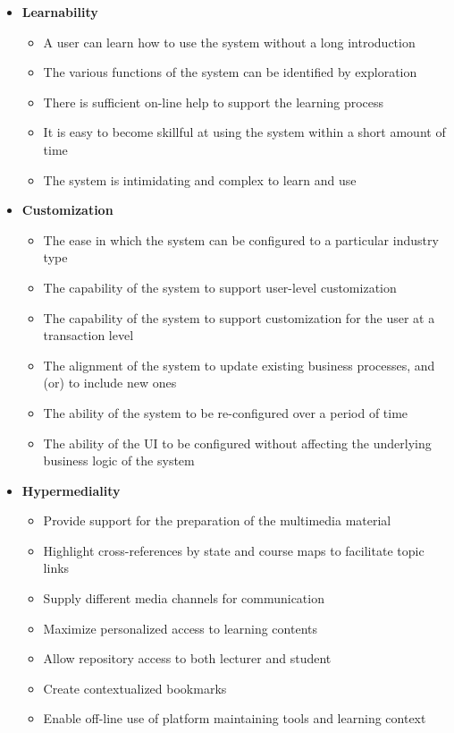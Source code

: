 \begin{itemize}
	\item \textbf{Learnability}
		\begin{itemize}
			\item A user can learn how to use the system without a long introduction
			\item The various functions of the system can be identified by exploration
			\item There is sufficient on-line help to support the learning process
			\item It is easy to become skillful at using the system within a short amount of time
			\item The system is intimidating and complex to learn and use
		\end{itemize}
		
	\item \textbf{Customization}
		\begin{itemize}
			\item The ease in which the system can be configured to a particular industry type
			\item The capability of the system to support user-level customization
			\item The capability of the system to support customization for the user at a transaction level
			\item The alignment of the system to update existing business processes, and (or) to include new ones
			\item The ability of the system to be re-configured over a period of time
			\item The ability of the UI to be configured without affecting the underlying business logic of the system
		\end{itemize}
		
	\item \textbf{Hypermediality}
		\begin{itemize}
			\item Provide support for the preparation of the multimedia material
			\item Highlight cross-references by state and course maps to facilitate topic links
			\item Supply different media channels for communication
			\item Maximize personalized access to learning contents
			\item Allow repository access to both lecturer and student
			\item Create contextualized bookmarks
			\item Enable off-line use of platform maintaining tools and learning context
		\end{itemize}
		

\end{itemize}
